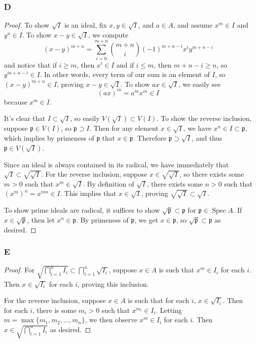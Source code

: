 \documentclass{article}
\newcommand{\frkp}{\mathfrak{p}}
\DeclareMathOperator{\Spec}{\mathrm{Spec}}
\begin{document}
\subsubsection{D}\label{3.4.D}
\begin{proof}
    To show $\sqrt I$ is an ideal, fix $x,y \in \sqrt I$, and $a\in A$, and assume $x^m \in I$ and $y^n\in I$. To show $x-y\in \sqrt I$, we compute
        \[
        (x-y)^{m+n}=\sum_{i=0}^{m+n} \binom{m+n}{i}(-1)^{m+n-i} x^i y^{m+n-i}
        \]
        and notice that if $i\geq m$, then $x^i\in I$ and if $i\le m$, then $m+n-i\ge n$, so $y^{m+n-i} \in I$. In other words, every term of our sum is an element of $I$, so $(x-y)^{m+n}\in I$, proving $x-y\in \sqrt I$. To show $ax\in \sqrt I$, we easily see
        \[
        (ax)^m=a^m x^m \in I
        \]
        because $x^m\in I$.

        It's clear that $I\subset \sqrt I$, so easily $V(\sqrt I)\subset V(I)$. To show the reverse inclusion, suppose $\frkp \in V(I)$, so $\frkp \supset I$. Then for any element $x\in \sqrt I$, we have $x^n \in I \subset \frkp$, which implies by primeness of $\frkp$ that $x\in \frkp$. Therefore $\frkp \supset \sqrt I$, and thus $\frkp \in V(\sqrt I)$.

        Since an ideal is always contained in its radical, we have immediately that $\sqrt I \subset \sqrt{\sqrt I}.$ For the reverse inclusion, suppose $x\in \sqrt{\sqrt I}$, so there exists some $m>0$ such that $x^m \in \sqrt I$. By definition of $\sqrt I$, there exists some $n>0$ such that $(x^m)^n = x^{mn} \in I$. This implies that $x\in \sqrt{I}$, proving $\sqrt{\sqrt{I}}\subset \sqrt{I}$.

        To show prime ideals are radical, it suffices to show $\sqrt{\frkp}\subset \frkp$ for $\frkp \in \Spec A$. If $x\in \sqrt{\frkp}$, then let $x^n \in \frkp$. By primeness of $\frkp$, we get $x\in \frkp$, so $\sqrt{\frkp}\subset \frkp$ as desired.
\end{proof}
\subsubsection{E}\label{3.4.E}
\begin{proof}
    For $\sqrt{\bigcap_{i=1}^n I_i} \subset  \bigcap_{i=1}^n \sqrt{I_i}$, suppose $x\in A$ is such that $x^m \in I_i$ for each $i$. Then $x \in \sqrt{I_i}$ for each $i$, proving this inclusion.

    For the reverse inclusion, suppose $x\in A$ is such that for each $i$, $x\in \sqrt{I_i}$. Then for each $i$, there is some $m_i>0$ such that $x^{m_i} \in I_i$. Letting $m=\max \{m_1,m_2,\dots,m_n\}$, we then observe $x^m \in I_i$ for each $i$. Then $x\in \sqrt{\bigcap_{i=1}^n I_i}$ as desired.
\end{proof}
\end{document}
